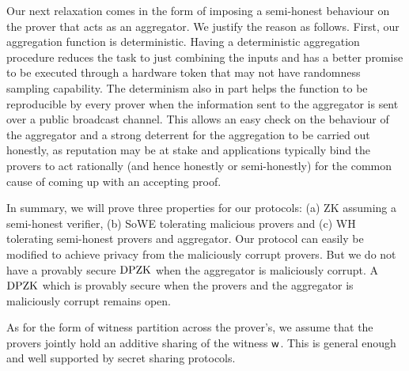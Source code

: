 Our next relaxation comes in the form of imposing a semi-honest behaviour on the prover that acts as an aggregator. We justify the reason as follows.  First,  our aggregation function is deterministic. Having  a deterministic aggregation procedure reduces the task to just combining the inputs and has a better promise to be executed through a hardware token that may not have randomness sampling capability.  The determinism also in part helps the function to be reproducible by every prover  when the information sent to the aggregator is sent over a public broadcast channel. This allows an easy check on the behaviour of the aggregator and a strong deterrent for the aggregation to be carried out honestly, as reputation may be at stake and applications typically bind the provers to act rationally (and hence honestly or semi-honestly) for the common cause of coming up with an accepting proof.  %

In summary,  we will prove three properties for our protocols: (a) ZK assuming a
semi-honest verifier, (b)  SoWE tolerating  malicious provers and (c) WH
tolerating semi-honest provers and aggregator. Our protocol can easily be modified to achieve privacy from the maliciously corrupt provers. But we do not have a provably secure $\text{DPZK}$ when the aggregator is maliciously corrupt. A $\text{DPZK}$ which is provably secure when the provers and the aggregator is maliciously corrupt remains open. 

As for the form of witness partition across the prover's, we assume that the provers jointly hold an additive sharing of the witness $\mathsf{w}$. This is general enough and well supported by secret sharing protocols.

